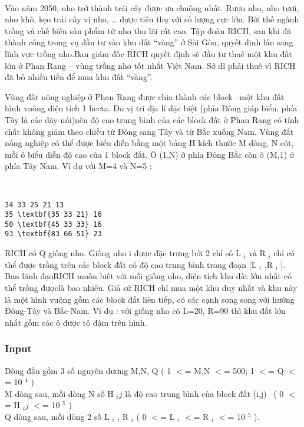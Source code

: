 

 

Vào năm 2050, nho trở thành trái cây được ưa chuộng nhất. Rượu nho, nho tươi, nho khô, kẹo trái cây vị nho, … được tiêu thụ với số lượng cực lớn. Bởi thế ngành trồng và chế biến sản phẩm từ nho thu lãi rất cao. Tập đoàn RICH, sau khi đã thành công trong vụ đầu tư vào khu đất “vàng” ở Sài Gòn, quyết định lấn sang lĩnh vực trồng nho.Ban giám đốc RICH quyết định sẽ đầu tư thuê một khu đất lớn ở Phan Rang – vùng trồng nho tốt nhất Việt Nam. Sở dĩ phải thuê vì RICH đã bỏ nhiều tiền để mua khu đất “vàng”.

Vùng đất nông nghiệp ở Phan Rang được chia thành các block –một khu đất hình vuông diện tích 1 hecta. Do vị trí địa lí đặc biệt (phía Đông giáp biển, phía Tây là các dãy núi)nên độ cao trung bình của các block đất ở Phan Rang có tính chất không giảm theo chiều từ Đông sang Tây và từ Bắc xuống Nam. Vùng đất nông nghiệp có thể được biểu diễn bằng một bảng H kích thước M dòng, N cột, mỗi ô biểu diễn độ cao của 1 block đất. Ô (1,N) ở phía Đông Bắc còn ô (M,1) ở phía Tây Nam. Ví dụ với M=4 và N=5 :

 
\begin{verbatim}
34 33 25 21 13
35 \textbf{35 33 21} 16
50 \textbf{45 33 33} 16
93 \textbf{83 66 51} 23

\end{verbatim}

RICH có Q giống nho. Giống nho i được đặc trưng bởi 2 chỉ số L $_ i $ và R $_ i $ chỉ có thể được trồng trên các block đất có độ cao trung bình trong đoạn [L $_ i $ ,R $_ i $ ]. Ban lãnh đạoRICH muốn biết với mỗi giống nho, diện tích khu đất lớn nhất có thể trồng đượclà bao nhiêu. Giả sử RICH chỉ mua một khu duy nhất và khu này là một hình vuông gồm các block đất liên tiếp, có các cạnh song song với hướng Đông-Tây và Bắc-Nam. Ví dụ : với giống nho có L=20, R=90 thì khu đất lớn nhất gồm các ô được tô đậm trên hình.

\subsubsection{Input}

Dòng đầu gồm 3 số nguyên dương M,N, Q ( 1 $<$= M,N $<$= 500; 1 $<$= Q $<$= 10 $^ 4 $ )
\\M dòng sau, mỗi dòng N số H $_ ij $ là độ cao trung bình của block đất (i,j)  ( 0 $<$= H $_ ij $ $<$= 10 $^ 5 $ )
\\Q dòng sau, mỗi dòng 2 số L $_ i $ , R $_ i $ ( 0 $<$= L $_ i $ $<$= R $_ i $ $<$= 10 $^ 5 $ ).

